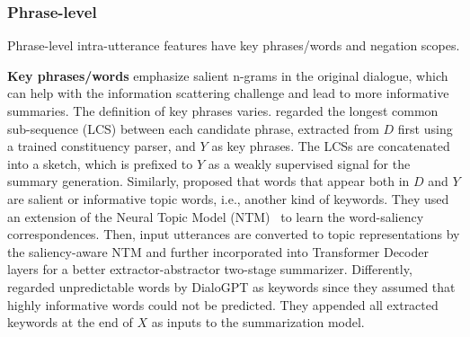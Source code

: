 \subsubsection{Phrase-level}
Phrase-level intra-utterance features have key phrases/words and negation scopes.
 
\textbf{Key phrases/words} emphasize salient 
n-grams in the original dialogue, which can help with the information scattering challenge and lead to more informative summaries. 
The definition of key phrases varies.
\citet{wu2021controllable} regarded the longest common sub-sequence (LCS) between each candidate phrase, extracted from $D$ first using a trained constituency parser, and $Y$ as key phrases. %
The LCSs are concatenated into a sketch, 
which is prefixed to $Y$ as a weakly 
supervised signal for the summary generation. 
Similarly, \citet{zou2021topic} proposed that words that appear both 
in $D$ and $Y$ are salient or informative topic words, i.e., another kind of keywords. 
They used an extension of the Neural Topic Model (NTM)~\cite{miao2017discovering} to learn the word-saliency correspondences. 
Then, input utterances are converted to topic representations by the saliency-aware NTM and further incorporated into Transformer Decoder layers for a better extractor-abstractor two-stage summarizer.
Differently, \citet{feng2021language} regarded unpredictable words by DialoGPT as keywords since they assumed that highly informative words could not be predicted. %
They appended all extracted keywords at the end of $X$ as inputs to the summarization model. 




